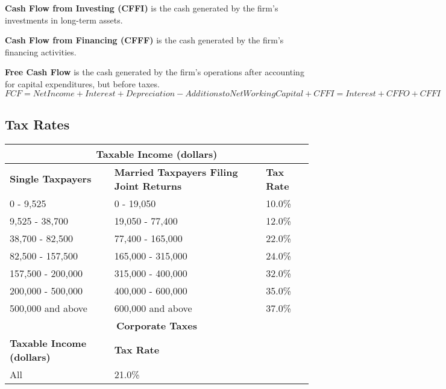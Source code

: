 \textbf{Cash Flow from Investing (CFFI)} is the cash generated by the firm's investments in long-term assets.

\textbf{Cash Flow from Financing (CFFF)} is the cash generated by the firm's financing activities.

\textbf{Free Cash Flow} is the cash generated by the firm's operations after accounting for capital expenditures, but before taxes.
$FCF = Net Income + Interest + Depreciation - Additions to Net Working Capital + CFFI = Interest + CFFO + CFFI$

\subsection{Tax Rates}

\begin{tabularx}{\linewidth}{X X X}
\toprule
\multicolumn{3}{c}{\textbf{Taxable Income (dollars)}} \\
\midrule
\textbf{Single Taxpayers} & \textbf{Married Taxpayers Filing Joint Returns} & \textbf{Tax Rate} \\
\midrule
0 - 9,525 & 0 - 19,050 & 10.0\% \\
9,525 - 38,700 & 19,050 - 77,400 & 12.0\% \\
38,700 - 82,500 & 77,400 - 165,000 & 22.0\% \\
82,500 - 157,500 & 165,000 - 315,000 & 24.0\% \\
157,500 - 200,000 & 315,000 - 400,000 & 32.0\% \\
200,000 - 500,000 & 400,000 - 600,000 & 35.0\% \\
500,000 and above & 600,000 and above & 37.0\% \\
\toprule
\multicolumn{3}{c}{\textbf{Corporate Taxes}} \\
\midrule
\textbf{Taxable Income (dollars)} & \textbf{Tax Rate} \\
\midrule
All & 21.0\% \\
\bottomrule
\end{tabularx}


